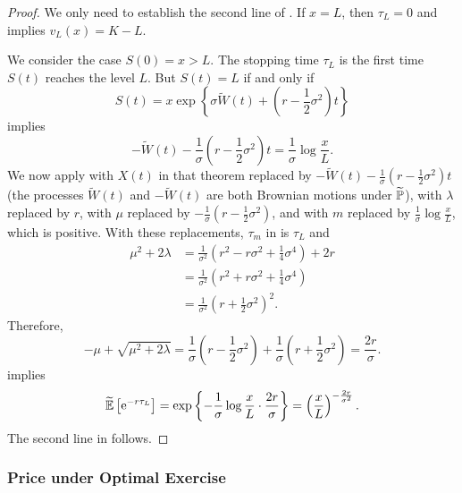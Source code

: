 \begin{proof}
	We only need to establish the second line of . If \(x = L\), then \(\tau_L = 0\) and  implies \(v_L(x) = K - L\).

	We consider the case \(S(0) = x > L\). The stopping time \(\tau_L\) is the first time \(S(t)\) reaches the level \(L\). But \(S(t) = L\) if and only if
	\[
		S(t) = x \exp \left\{ \sigma \widetilde{W}(t) + \left( r - \frac{1}{2}\sigma^2 \right) t \right\}
	\]
	implies
	\[
		-\widetilde{W}(t) - \frac{1}{\sigma}\left( r - \frac{1}{2}\sigma^2 \right) t = \frac{1}{\sigma} \log \frac{x}{L}.
	\]
	We now apply  with \(X(t)\) in that theorem replaced by \(-\widetilde{W}(t) - \frac{1}{\sigma}\left( r - \frac{1}{2}\sigma^2 \right) t\) (the processes \(\widetilde{W}(t)\) and \(-\widetilde{W}(t)\) are both Brownian motions under \(\widetilde{\mathbb{P}}\)), with \(\lambda\) replaced by \(r\), with \(\mu\) replaced by \(-\frac{1}{\sigma}\left( r - \frac{1}{2}\sigma^2 \right)\), and with \(m\) replaced by \(\frac{1}{\sigma} \log \frac{x}{L}\), which is positive. With these replacements, \(\tau_m\) in  is \(\tau_L\) and
	\begin{align*}
		\mu^2 + 2\lambda & = \frac{1}{\sigma^2} \left( r^2 - r\sigma^2 + \frac{1}{4}\sigma^4 \right) + 2r \\
		                 & = \frac{1}{\sigma^2} \left( r^2 + r\sigma^2 + \frac{1}{4}\sigma^4 \right)      \\
		                 & = \frac{1}{\sigma^2} \left( r + \frac{1}{2}\sigma^2 \right)^2.
	\end{align*}
	Therefore,
	\[
		-\mu + \sqrt{\mu^2 + 2\lambda} = \frac{1}{\sigma}\left( r - \frac{1}{2}\sigma^2 \right) + \frac{1}{\sigma}\left( r + \frac{1}{2}\sigma^2 \right) = \frac{2r}{\sigma}.
	\]
	 implies
	\[
		\widetilde{\mathbb{E}} \left[ \mathrm{e}^{-r\tau_L} \right] = \exp \left\{ -\frac{1}{\sigma} \log \frac{x}{L} \cdot \frac{2r}{\sigma} \right\} = \left( \frac{x}{L} \right)^{-\frac{2r}{\sigma^2}}.
	\]
	The second line in  follows.
\end{proof}

\subsubsection{Price under Optimal Exercise}

